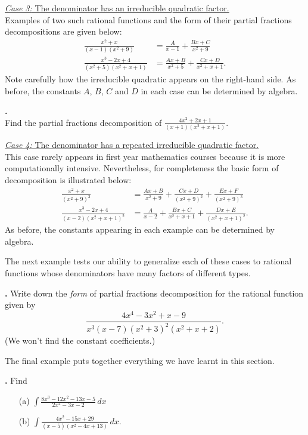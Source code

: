 \documentclass[t]{beamer}
\theoremstyle{plain}
\theoremstyle{definition}
\newcommand{\ds}{\displaystyle}
\newcounter{heading}
\newcommand{\newhead}[1]{\medskip\stepcounter{heading}\noindent\textbf{\hspace{0.2cm}{#1}.}}
\begin{document}
\begin{frame}
\noindent\underline{\textit{Case 3:} The denominator has an irreducible quadratic factor.}\pause\\
Examples of two such rational functions and the form of their partial fractions decompositions are given below:\pause
\begin{align*}
\frac{x^2+x}{(x-1)(x^2+9)}&= {\frac{A}{x-1}+\frac{Bx+C}{x^2+9}}\\
\frac{x^3-2x+4}{(x^2+5)(x^2+x+1)}&= {\frac{Ax+B}{x^2+5}+\frac{Cx+D}{x^2+x+1}}.
\end{align*}\pause
Note carefully how the irreducible quadratic appears on the right-hand side. As before, the constants $A$, $B$, $C$ and $D$ in each case can be determined by algebra.\pause

\newhead{Example} \\Find the partial fractions decomposition of $\ds\frac{4x^2+2x+1}{(x+1)(x^2+x+1)}$.
\end{frame}

\begin{frame}
\noindent\underline{\textit{Case 4:} The denominator has a repeated irreducible quadratic factor.}\pause\\
This case rarely appears in first year mathematics courses because it is more computationally intensive. Nevertheless, for completeness the basic form of decomposition is illustrated below:\pause
\begin{align*}
\frac{x^2+x}{(x^2+9)^3}&= {\frac{Ax+B}{x^2+9}+\frac{Cx+D}{(x^2+9)^2}+\frac{Ex+F}{(x^2+9)^3}}\\
\frac{x^3-2x+4}{(x-2)(x^2+x+1)^2}&= {\frac{A}{x-2}+\frac{Bx+C}{x^2+x+1}+\frac{Dx+E}{(x^2+x+1)^2}}.
\end{align*}
As before, the constants appearing in each example can be determined by algebra.
\end{frame}

\begin{frame}
\noindent The next example tests our ability to generalize each of these cases to rational functions whose denominators have many factors of different types.\pause

\newhead{Example}
Write down the \textit{form} of partial fractions decomposition for the rational function given by
\[\frac{4x^4-3x^2+x-9}{x^3(x-7)(x^2+3)^2(x^2+x+2)}.\]
(We won't find the constant coefficients.)
\end{frame}

\begin{frame}
\noindent The final example puts together everything we have learnt in this section.\pause

\newhead{Example} Find
\begin{enumerate}[<+->]
\item[(a)] $\ds\int\frac{8x^3-12x^2-13x-5}{2x^2-3x-2}\,dx$
\item[(b)] $\ds\int\frac{4x^2-15x+29}{(x-5)(x^2-4x+13)}\,dx$.
\end{enumerate}
\end{frame}
\end{document}
